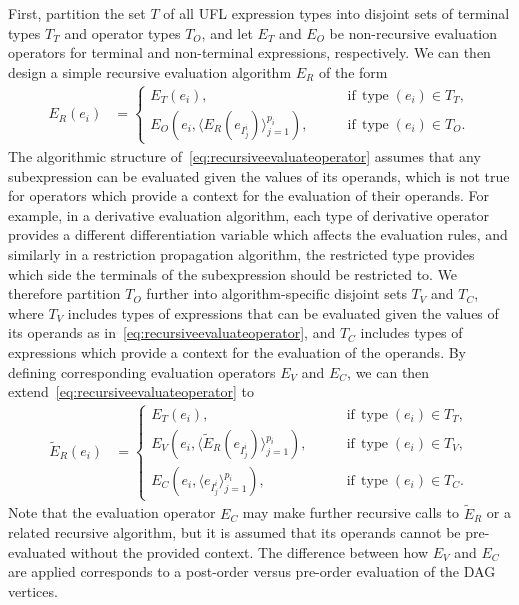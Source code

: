 \documentclass[prodmode,acmtoms]{acmsmall}
\newcommand{\type}{\operatorname{type}}
\begin{document}
First, partition the set $T$ of all UFL expression types into disjoint
sets of terminal types $T_T$ and operator types $T_O$, and let $E_T$
and $E_O$ be non-recursive evaluation operators for terminal and
non-terminal expressions, respectively. We can then design a simple
recursive evaluation algorithm $E_R$ of the form
\begin{align}
  \label{eq:recursiveevaluateoperator}
  E_R(e_i) &= \begin{cases}
    E_T(e_i),
    \qquad & \text{if} \, \type(e_i) \in T_T, \\
    E_O\left(e_i, \langle E_R(e_{I^i_j}) \rangle_{j=1}^{p_i}\right),
    \qquad & \text{if} \, \type(e_i) \in T_O.
  \end{cases}
\end{align}
The algorithmic structure of~\eqref{eq:recursiveevaluateoperator}
assumes that any subexpression can be evaluated given the values of
its operands, which is not true for operators which provide a
context for the evaluation of their operands. For example, in a
derivative evaluation algorithm, each type of derivative operator
provides a different differentiation variable which affects the
evaluation rules, and similarly in a restriction propagation algorithm,
the restricted type provides which side the terminals of the subexpression
should be restricted to. We therefore partition $T_O$
further into algorithm-specific disjoint sets $T_V$ and $T_C$, where
$T_V$ includes types of expressions that can be evaluated given the
values of its operands as in~\eqref{eq:recursiveevaluateoperator}, and
$T_C$ includes types of expressions which provide a context
for the evaluation of the operands. By defining corresponding
evaluation operators $E_V$ and $E_C$, we can then
extend~\eqref{eq:recursiveevaluateoperator} to
\begin{align}
  \label{eq:flexibleevaluateoperator}
  \tilde{E}_R(e_i) &= \begin{cases}
    E_T(e_i),
    \qquad & \text{if} \, \type(e_i) \in T_T, \\
    E_V\left(e_i, \langle \tilde{E}_R(e_{I^i_j}) \rangle_{j=1}^{p_i}\right),
    \qquad & \text{if} \, \type(e_i) \in T_V, \\
    E_C\left(e_i, \langle e_{I^i_j} \rangle_{j=1}^{p_i}\right),
    \qquad & \text{if} \, \type(e_i) \in T_C.
  \end{cases}
\end{align}
Note that the evaluation operator $E_C$ may make further recursive
calls to $\tilde{E}_R$ or a related recursive algorithm, but it is
assumed that its operands cannot be pre-evaluated without the provided
context. The difference between how $E_V$ and $E_C$ are applied
corresponds to a post-order versus pre-order evaluation of the DAG
vertices.
\end{document}
